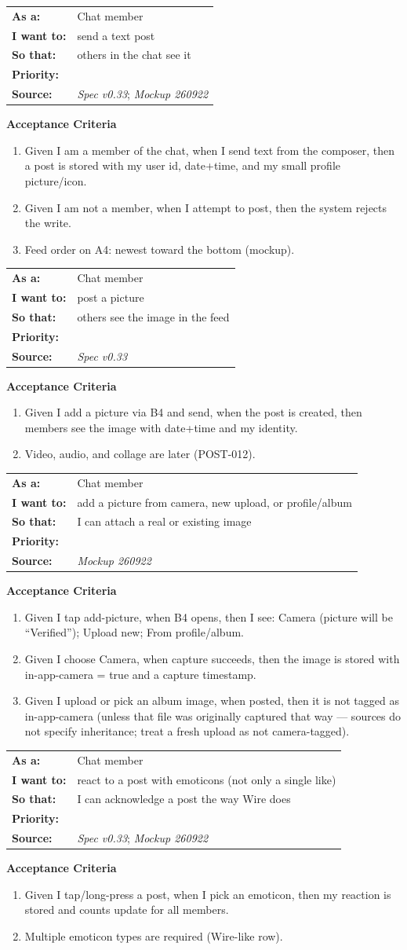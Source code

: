 \documentclass[11pt,a4paper]{article}
\makeatletter
\newcommand{\priPzero}{\colorbox{p0}{\makebox[4.6em]{\textcolor{white}{\scriptsize\bfseries P0 V1}}}}
\newcommand{\srcSpec}{\textit{Spec v0.33}}
\newcommand{\srcMock}{\textit{Mockup 260922}}
\newenvironment{story}[1]{%
  \Needspace{10\baselineskip}%
  \vspace{0.7em}%
  \noindent
  \colorbox{navy}{\makebox[\dimexpr\textwidth-2\fboxsep\relax][l]{\textcolor{white}{\bfseries\ #1}}}%
  \par\vspace{0.35em}%
}{\par\vspace{0.55em}}
\newcommand{\storymeta}[5]{%
  \noindent
  \begin{tabularx}{\textwidth}{@{}>{\bfseries}l X@{}}
    As a: & #1 \\
    I want to: & #2 \\
    So that: & #3 \\
    Priority: & #4 \\
    Source: & #5 \\
  \end{tabularx}
  \par\vspace{0.3em}
}
\newcommand{\achead}{\noindent\textbf{Acceptance Criteria}\par}
\makeatother
\begin{document}
\begin{story}{POST-001 --- Text post}
\storymeta{Chat member}{send a text post}{others in the chat see it}{\priPzero}{\srcSpec; \srcMock}
\achead
\begin{enumerate}
  \item Given I am a member of the chat, when I send text from the composer, then a post is stored with my user id, date+time, and my small profile picture/icon.
  \item Given I am not a member, when I attempt to post, then the system rejects the write.
  \item Feed order on A4: newest toward the bottom (mockup).
\end{enumerate}
\end{story}

\begin{story}{POST-002 --- Picture post}
\storymeta{Chat member}{post a picture}{others see the image in the feed}{\priPzero}{\srcSpec}
\achead
\begin{enumerate}
  \item Given I add a picture via B4 and send, when the post is created, then members see the image with date+time and my identity.
  \item Video, audio, and collage are later (POST-012).
\end{enumerate}
\end{story}

\begin{story}{POST-003 --- Choose camera, upload, or album image (B4)}
\storymeta{Chat member}{add a picture from camera, new upload, or profile/album}{I can attach a real or existing image}{\priPzero}{\srcMock}
\achead
\begin{enumerate}
  \item Given I tap add-picture, when B4 opens, then I see: Camera (picture will be ``Verified''); Upload new; From profile/album.
  \item Given I choose Camera, when capture succeeds, then the image is stored with in-app-camera = true and a capture timestamp.
  \item Given I upload or pick an album image, when posted, then it is not tagged as in-app-camera (unless that file was originally captured that way --- sources do not specify inheritance; treat a fresh upload as not camera-tagged).
\end{enumerate}
\end{story}

\begin{story}{POST-004 --- React with emoticons}
\storymeta{Chat member}{react to a post with emoticons (not only a single like)}{I can acknowledge a post the way Wire does}{\priPzero}{\srcSpec; \srcMock}
\achead
\begin{enumerate}
  \item Given I tap/long-press a post, when I pick an emoticon, then my reaction is stored and counts update for all members.
  \item Multiple emoticon types are required (Wire-like row).
\end{enumerate}
\end{story}
\end{document}
